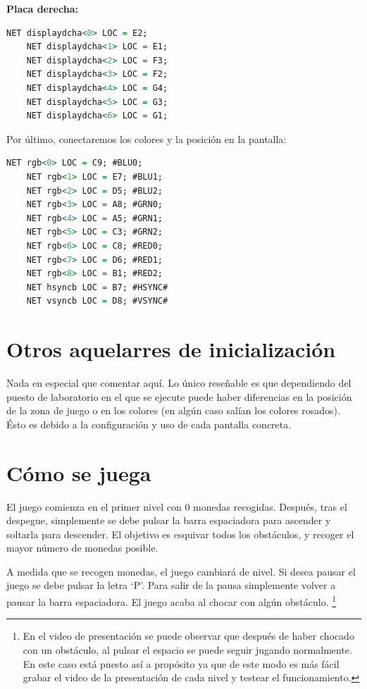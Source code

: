 \documentclass[11pt, a4paper, spanish, openright, twoside]{book}
\begin{document}
\textbf{Placa derecha:}
	
\begin{lstlisting}[language=VHDL]
	NET displaydcha<0> LOC = E2;
	NET displaydcha<1> LOC = E1;
	NET displaydcha<2> LOC = F3;
	NET displaydcha<3> LOC = F2;
	NET displaydcha<4> LOC = G4;
	NET displaydcha<5> LOC = G3;
	NET displaydcha<6> LOC = G1;
\end{lstlisting}


Por último, conectaremos los colores y la posición en la pantalla:

\begin{lstlisting}[language=VHDL]
	NET rgb<0> LOC = C9; #BLU0;
	NET rgb<1> LOC = E7; #BLU1;
	NET rgb<2> LOC = D5; #BLU2;
	NET rgb<3> LOC = A8; #GRN0; 
	NET rgb<4> LOC = A5; #GRN1;
	NET rgb<5> LOC = C3; #GRN2;
	NET rgb<6> LOC = C8; #RED0;
	NET rgb<7> LOC = D6; #RED1;
	NET rgb<8> LOC = B1; #RED2;
	NET hsyncb LOC = B7; #HSYNC# 
	NET vsyncb LOC = D8; #VSYNC# 
\end{lstlisting}

\section{Otros aquelarres de inicialización}

Nada en especial que comentar aquí. Lo único reseñable es que dependiendo del puesto de laboratorio en el que se ejecute puede haber diferencias en la posición de la zona de juego o en los colores (en algún caso salían los colores rosados). Ésto es debido a la configuración y uso de cada pantalla concreta.


\section{Cómo se juega}
El juego comienza en el primer nivel con 0 monedas recogidas. Después, tras el despegue, simplemente se debe pulsar la barra espaciadora para ascender y soltarla para descender. El objetivo es esquivar todos los obstáculos, y recoger el mayor número de monedas posible. 

A medida que se recogen monedas, el juego cambiará de nivel. Si desea pausar el juego se debe pulsar la letra `P'. Para salir de la pausa simplemente volver a pausar la barra espaciadora. El juego acaba al chocar con algún obstáculo. \footnote{En el video de presentación se puede observar que después de haber chocado con un obstáculo, al pulsar el espacio se puede seguir jugando normalmente. En este caso está puesto así a propósito ya que de este modo es más fácil grabar el video de la presentación de cada nivel y testear el funcionamiento.}
\end{document}

